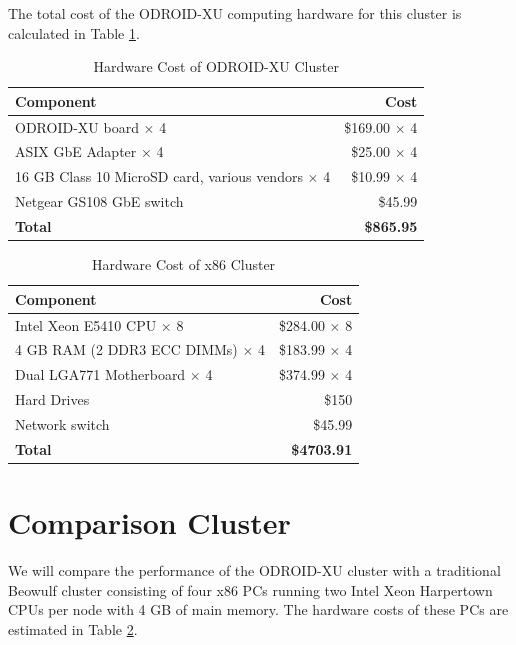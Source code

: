 \documentclass[11pt]{book}
\begin{document}
The total cost of the ODROID-XU computing hardware for this cluster is calculated in Table
\ref{xu-cost-table}.

\begin{table}
  \caption{Hardware Cost of ODROID-XU Cluster}\label{xu-cost-table}
  \centering
  \begin{tabular}{| l | r |}
    \hline
    \textbf{Component} & \textbf{Cost} \\ \hline
    ODROID-XU board $\times$ 4 & \$169.00 $\times$ 4 \\
    ASIX GbE Adapter $\times$ 4 & \$25.00 $\times$ 4 \\
    16 GB Class 10 MicroSD card, various vendors $\times$ 4 & \$10.99 $\times$ 4 \\
    Netgear GS108 GbE switch & \$45.99 \\
    \hline
    \textbf{Total} & \textbf{\$865.95} \\ \hline
  \end{tabular}
\end{table}

\begin{table}
  \caption{Hardware Cost of x86 Cluster}\label{x86-cost-table}
  \centering
  \begin{tabular}{| l | r |}
    \hline
    \textbf{Component} & \textbf{Cost} \\
    \hline
    Intel Xeon E5410 CPU $\times$ 8 & \$284.00 $\times$ 8 \\
    4 GB RAM (2 DDR3 ECC DIMMs) $\times$ 4 & \$183.99 $\times$ 4 \\
    Dual LGA771 Motherboard $\times$ 4 & \$374.99 $\times$ 4 \\
    Hard Drives & \$150 \\
    Network switch & \$45.99 \\
    \hline
    \textbf{Total} & \textbf{\$4703.91} \\ \hline
  \end{tabular}
\end{table}

\section{Comparison Cluster}

We will compare the performance of the ODROID-XU cluster with a traditional Beowulf
cluster consisting of four x86 PCs running two Intel Xeon Harpertown CPUs per node with 4 GB of main memory.
The hardware costs of these PCs are estimated in Table \ref{x86-cost-table}.
\end{document}
